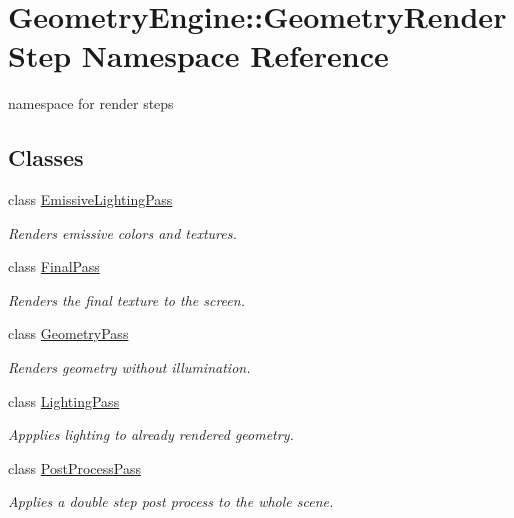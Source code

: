 \hypertarget{namespace_geometry_engine_1_1_geometry_render_step}{}\section{Geometry\+Engine\+::Geometry\+Render\+Step Namespace Reference}
\label{namespace_geometry_engine_1_1_geometry_render_step}


namespace for render steps  


\subsection*{Classes}
\begin{DoxyCompactItemize}
\item 
class \mbox{\hyperlink{class_geometry_engine_1_1_geometry_render_step_1_1_emissive_lighting_pass}{Emissive\+Lighting\+Pass}}
\begin{DoxyCompactList}\small\item\em Renders emissive colors and textures. \end{DoxyCompactList}\item 
class \mbox{\hyperlink{class_geometry_engine_1_1_geometry_render_step_1_1_final_pass}{Final\+Pass}}
\begin{DoxyCompactList}\small\item\em Renders the final texture to the screen. \end{DoxyCompactList}\item 
class \mbox{\hyperlink{class_geometry_engine_1_1_geometry_render_step_1_1_geometry_pass}{Geometry\+Pass}}
\begin{DoxyCompactList}\small\item\em Renders geometry without illumination. \end{DoxyCompactList}\item 
class \mbox{\hyperlink{class_geometry_engine_1_1_geometry_render_step_1_1_lighting_pass}{Lighting\+Pass}}
\begin{DoxyCompactList}\small\item\em Appplies lighting to already rendered geometry. \end{DoxyCompactList}\item 
class \mbox{\hyperlink{class_geometry_engine_1_1_geometry_render_step_1_1_post_process_pass}{Post\+Process\+Pass}}
\begin{DoxyCompactList}\small\item\em Applies a double step post process to the whole scene. \end{DoxyCompactList}\item 

\end{DoxyCompactItemize}
